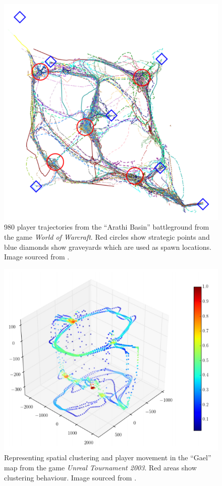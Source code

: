 \documentclass[journal]{IEEEtran}
\begin{document}
\begin{figure}[h]
    \centering
    \includegraphics[width=0.8\linewidth]{Heatmap3.png}
    \caption{980 player trajectories from the ``Arathi Basin'' battleground from the game \textit{World of Warcraft}. Red circles show strategic points and blue diamonds show graveyards which are used as spawn locations. Image sourced from \cite{miller2009avatar}.}
    \label{fig:hm3}
\end{figure}

\begin{figure}[h]
    \centering
    \includegraphics[width=0.8\linewidth]{Heatmap2.png}
    \caption{Representing spatial clustering and player movement in the ``Gael'' map from the game \textit{Unreal Tournament 2003}. Red areas show clustering behaviour. Image sourced from \cite{bauckhage2014beyond}.}
    \label{fig:hm2}
\end{figure}
\end{document}

